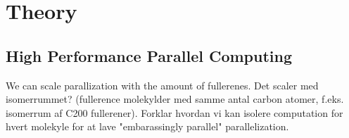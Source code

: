 \section{Theory}

\subsection{High Performance Parallel Computing}

We can scale parallization with the amount of fullerenes. Det scaler med isomerrummet? (fullerence molekylder med samme antal carbon atomer, f.eks. isomerrum af C200 fullerener).
Forklar hvordan vi kan isolere computation for hvert molekyle for at lave "embarassingly parallel" parallelization.


